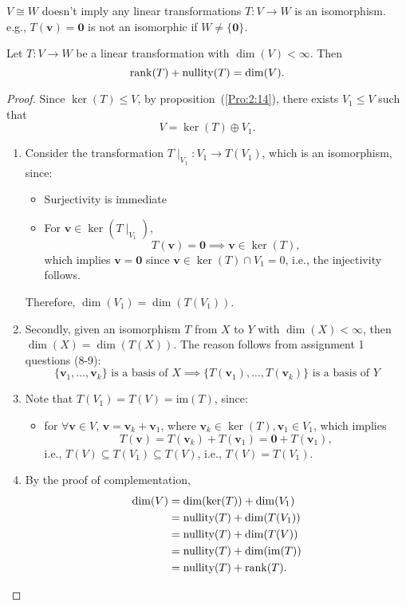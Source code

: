 \begin{remark}
$V\cong W$ doesn't imply any linear transformations $T:V\to W$ is an isomorphism. e.g., 
$T(\bm v)=\bm0$ is not an isomorphic if $W\ne\{\bm0\}$.
\end{remark}

\begin{theorem}
Let $T:V\to W$ be a linear transformation with $\dim(V)<\infty$. Then
\[
\operatorname{rank}(T)+\text{nullity}(T)=\dim(V).
\]
\end{theorem}

\begin{proof}
Since $\ker(T)\le V$, by proposition~(\ref{Pro:2:14}), there exists  $V_1\le V$ such that 
\[
V=\ker(T)\oplus V_1.
\]
\begin{enumerate}
\item
Consider the transformation $T\mid_{V_1}:V_1\to T(V_1)$, which is an isomorphism, since:
\begin{itemize}
\item
Surjectivity is immediate
\item
For $\bm v\in\ker(T\mid_{V_1})$,
\[
T(\bm v)=\bm0\implies \bm v\in\ker(T),
\]
which implies $\bm v=\bm0$ since $\bm v\in\ker(T)\cap V_1=0$, i.e., the injectivity follows.
\end{itemize}
Therefore, $\dim(V_1)=\dim(T(V_1))$.
\item
Secondly, given an isomorphism $T$ from $X$ to $Y$ with $\dim(X)<\infty$, then $\dim(X)=\dim(T(X))$. The reason follows from assignment 1 questions (8-9):
\[
\{\bm v_1,\dots,\bm v_k\}\text{ is a basis of $X$}\implies
\{T(\bm v_1),\dots,T(\bm v_k)\}\text{ is a basis of $Y$}
\]
\item
Note that $T(V_1)=T(V)=\text{im}(T)$, since:
\begin{itemize}
\item
for $\forall\bm v\in V$, $\bm v=\bm v_k+\bm v_1$, where $\bm v_k\in\ker(T),\bm v_1\in V_1$, which implies
\[
T(\bm v)=T(\bm v_k)+T(\bm v_1)=\bm0+T(\bm v_1),
\]
i.e., $T(V)\subseteq T(V_1)\subseteq T(V)$, i.e., $T(V)=T(V_1)$.
\end{itemize}
\item
By the proof of complementation, 
\begin{align*}
\dim(V)&=\dim(\ker(T))+\dim(V_1)\\
&=\text{nullity}(T)+\dim(T(V_1))\\
&=\text{nullity}(T)+\dim(T(V))\\
&=\text{nullity}(T)+\dim(\text{im}(T))\\
&=\text{nullity}(T)+\operatorname{rank}(T).
\end{align*}
\end{enumerate}
\end{proof}













